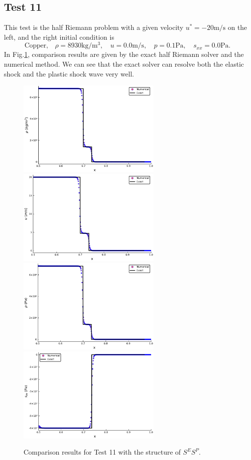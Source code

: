 \documentclass[review]{elsarticle}
\numberwithin{equation}{section}
\numberwithin{table}{section}
\begin{document}
\subsection{Test 11}
This test is the half Riemann problem with a given velocity $u^* = -20\text{m/s}$ on the left, and the right initial condition is
\begin{equation}
 \text{Copper,}\quad\rho = 8930\text{kg}/\text{m}^3, \quad  u = 0.0\text{m}/\text{s}, \quad  p =0.1\text{Pa}, \quad  s_{xx}=0.0\text{Pa}.
\end{equation}
In Fig.\ref{fig:case9}, comparison results are given by the exact half Riemann solver and the numerical method. We can see that the exact solver can resolve both the elastic shock and the  plastic shock wave very well.
\begin{figure}[ht]
  \centering
  \includegraphics[width= 7cm] {case10rho.pdf}
  \includegraphics[width= 7cm] {case10u.pdf}
  \includegraphics[width= 7cm] {case10p.pdf}
  \includegraphics[width= 7cm] {case10sxx.pdf}

    \caption{Comparison results for Test 11 with the structure of $S^ES^P$.  }
  \label{fig:case9}
\end{figure}
\end{document}
